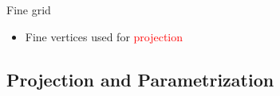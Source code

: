 \begin{frame}
\begin{overlayarea}{\textwidth}{0.9\textheight}
\begin{minipage}{0.45\textwidth}
\begin{block}{\centering Fine grid}
\begin{figure}
	\end{figure}
	\begin{itemize}
	\item Fine vertices used for \textcolor{red}{projection}
	\end{itemize}
	\end{block}
	\end{minipage}
\end{overlayarea}
\end{frame}


\subsection{Projection and Parametrization}
